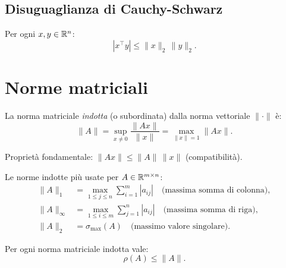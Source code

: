 \subsection{Disuguaglianza di Cauchy-Schwarz}

\begin{theorem}
Per ogni $x, y \in \mathbb{R}^n$:
\begin{equation}
  |x^\top y| \leq \|x\|_2\,\|y\|_2.
  \label{eq:cauchy_schwarz}
\end{equation}
\end{theorem}

\section{Norme matriciali}
\label{sec:norme_matriciali}

\begin{definition}
La norma matriciale \emph{indotta} (o subordinata) dalla norma vettoriale $\|\cdot\|$
è:
\begin{equation}
  \|A\| = \sup_{x \neq 0} \frac{\|Ax\|}{\|x\|} = \max_{\|x\|=1} \|Ax\|.
  \label{eq:norma_mat}
\end{equation}
\end{definition}

Proprietà fondamentale: $\|Ax\| \leq \|A\|\,\|x\|$ (compatibilità).

Le norme indotte più usate per $A \in \mathbb{R}^{m \times n}$:
\begin{align}
  \|A\|_1      &= \max_{1 \leq j \leq n} \sum_{i=1}^m |a_{ij}|
                  \quad \text{(massima somma di colonna)}, \\
  \|A\|_\infty &= \max_{1 \leq i \leq m} \sum_{j=1}^n |a_{ij}|
                  \quad \text{(massima somma di riga)}, \\
  \|A\|_2      &= \sigma_{\max}(A)
                  \quad \text{(massimo valore singolare)}.
\end{align}

\begin{proposition}
Per ogni norma matriciale indotta vale:
\begin{equation}
  \rho(A) \leq \|A\|.
\end{equation}
\end{proposition}

